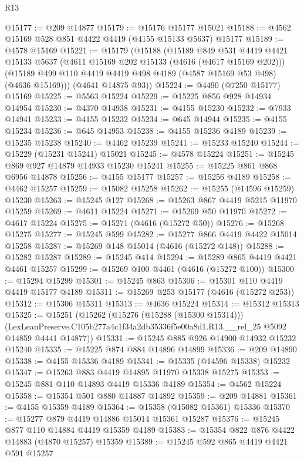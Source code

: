 \begin{lexlean}{R13}
\begin{coremodule}
@15177 := @209 @14877
@15179 := @15176 @15177 @15021
@15188 := @4562 @15169 @528 @851 @4422 @4419 (@4155 @15133 @5637) @15177
@15189 := @4578 @15169
@15221 := @15179
    (@15188
      (@15189
        @849
        @531
        @4419
        @4421
        @15133
        @5637
        (@4611 @15169 @202 @15133 (@4616 (@4617 @15169 @202)))
        (@15189 @499 @110 @4419 @4419 @498 @4189 (@4587 @15169 @53 @498) (@4636 @15169)))
      (@4641 @14875 @93))
@15224 := @4490 (@7250 @15177) @15169
@15225 := @5563 @15224
@15229 := @15225 @856 @928 @14934 @14954
@15230 := @4370 @14938
@15231 := @4155 @15230
@15232 := @7933 @14941
@15233 := @4155 @15232
@15234 := @645 @14944
@15235 := @4155 @15234
@15236 := @645 @14953
@15238 := @4155 @15236 @4189
@15239 := @15235 @15238
@15240 := @4462 @15239
@15241 := @15233 @15240
@15244 := @15229 (@15231 @15241) @15021
@15245 := @4578 @15224
@15251 := @15245 @869 @927 @14879 @14933 @15230 @15241
@15255 := @15225 @861 @868 @6956 @14878
@15256 := @4155 @15177
@15257 := @15256 @4189
@15258 := @4462 @15257
@15259 := @15082 @15258
@15262 := @15255 (@14596 @15259) @15230
@15263 := @15245 @127
@15268 := @15263 @867 @4419 @5215 @11970 @15259
@15269 := @4611 @15224
@15271 := @15269 @50 @11970
@15272 := @4617 @15224
@15275 := @15271 (@4616 (@15272 @50))
@15276 := @15268 @15275
@15277 := @15245 @599
@15282 := @15277 @866 @4419 @4422 @15014 @15258
@15287 := @15269 @148 @15014 (@4616 (@15272 @148))
@15288 := @15282 @15287
@15289 := @15245 @414
@15294 := @15289 @865 @4419 @4421 @4461 @15257
@15299 := @15269 @100 @4461 (@4616 (@15272 @100))
@15300 := @15294 @15299
@15301 := @15245 @863
@15306 := @15301 @110 @4419 @4419 @15177 @4189
@15311 := @15269 @253 @15177 (@4616 (@15272 @253))
@15312 := @15306 @15311
@15313 := @4636 @15224
@15314 := @15312 @15313
@15325 := @15251
    (@15262
      (@15276 (@15288 (@15300 @15314)))
      (LexLeanPreserve.C105b277a4c1f34a2db35336f5e00a8d1.R13.__rel_25 @5092 @14859 @4441 @14877))
@15331 := @15245 @885 @926 @14900 @14932 @15232 @15240
@15335 := @15225 @874 @884 @14896 @14899
@15336 := @209 @14890
@15338 := @4155 @15336 @4189
@15341 := @15335 (@14596 @15338) @15232
@15347 := @15263 @883 @4419 @14895 @11970 @15338 @15275
@15353 := @15245 @881 @110 @14893 @4419 @15336 @4189
@15354 := @4562 @15224
@15358 := @15354 @501 @880 @14887 @14892
@15359 := @209 @14881
@15361 := @4155 @15359 @4189
@15364 := @15358 (@15082 @15361) @15336
@15370 := @15277 @879 @4419 @14886 @15014 @15361 @15287
@15376 := @15245 @877 @110 @14884 @4419 @15359 @4189
@15383 := @15354 @822 @876 @4422 @14883 (@4870 @15257) @15359
@15389 := @15245 @592 @865 @4419 @4421 @591 @15257

\end{coremodule}
\end{lexlean}
